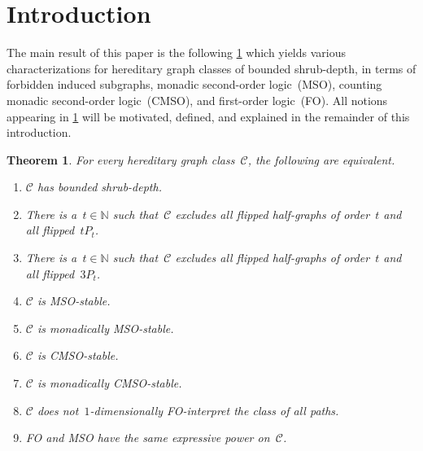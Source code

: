 \documentclass[11pt]{article}      \usepackage[margin=1in]{geometry}  \usepackage{microtype}
\newtheorem{theorem}{Theorem}[section]
\theoremstyle{definition}
\newcommand{\N}[0]{\mathrm{\mathbb{N}}}
\newcommand{\CC}{\mathcal{C}}
\begin{document}
\newpage
\tableofcontents
\newpage
{}
\setcounter{page}{1}


\section{Introduction}
The main result of this paper is the following \cref{thm:main} which yields various characterizations for hereditary graph classes of bounded shrub-depth, in terms of forbidden induced subgraphs, monadic second-order logic~(MSO), counting monadic second-order logic~(CMSO), and first-order logic~(FO).
All notions appearing in \cref{thm:main} will be motivated, defined, and explained in the remainder of this introduction.

\begin{theorem}\label{thm:main}
  For every hereditary graph class~$\CC$, the following are equivalent.
  \begin{enumerate}
    \item $\CC$ has bounded shrub-depth.
    \item There is a~$t\in \N$ such that~$\CC$ excludes all flipped half-graphs of order~$t$ and
    all flipped~$tP_t$.
    \item There is a~$t\in \N$ such that~$\CC$ excludes all flipped half-graphs of order~$t$ and
    all flipped~$3P_t$.
    \item $\CC$ is MSO-stable.
    \item $\CC$ is monadically MSO-stable.
    \item $\CC$ is CMSO-stable.
    \item $\CC$ is monadically CMSO-stable.
    \item $\CC$ does not~$1$-dimensionally FO-interpret the class of all paths.
    \item FO and MSO have the same expressive power on~$\CC$.
  \end{enumerate}
\end{theorem}
\end{document}
